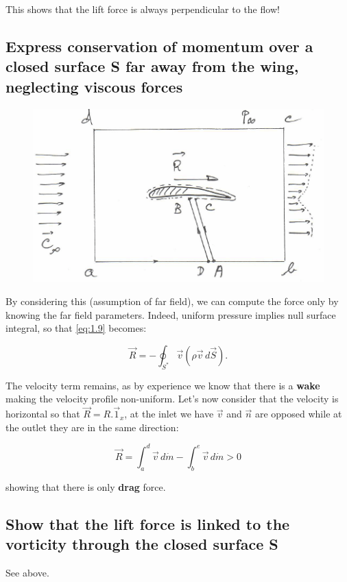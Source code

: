 \documentclass[british,french,11pt, a4paper, openany]{article}
\begin{document}
This shows that the lift force is always perpendicular to the flow!


\subsection{Express conservation of momentum over a closed surface S far away from the wing, neglecting viscous forces}
\begin{figure}
	\vspace{-5mm}
	\includegraphics[scale=0.4]{ch1/2}
\end{figure}
By considering this (assumption of far field), we can compute the force only by knowing the far field parameters. Indeed, uniform pressure implies null surface integral, so that \eqref{eq:1.9} becomes:

\begin{equation}
\vec{R} = -\oint _{S^*} \vec{v} (\rho \vec{v} \, d\vec{S}).
\end{equation}

The velocity term remains, as by experience we know that there is a \textbf{wake} making the velocity profile non-uniform. Let's now consider that the velocity is horizontal so that $\vec{R} = R.\vec{1}_x$, at the inlet we have $\vec{v}$ and $\vec{n}$ are opposed while at the outlet they are in the same direction: 

\begin{equation}
\vec{R} = \int _a^d \vec{v}\, d\dot{m} - \int _b^e \vec{v}\, d\dot{m} > 0
\end{equation}

showing that there is only \textbf{drag} force.

\subsection{Show that the lift force is linked to the vorticity through the closed surface S}
See above.
\end{document}
